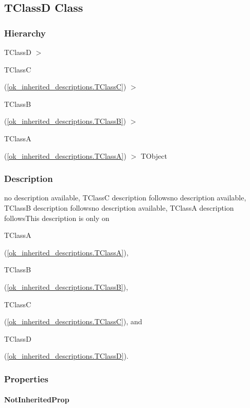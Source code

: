 \documentclass{report}
\begin{document}
\subsection*{TClassD Class}
\subsubsection*{\large{\textbf{Hierarchy}}\normalsize\hspace{1ex}\hfill}
TClassD {$>$} \begin{ttfamily}TClassC\end{ttfamily}(\ref{ok_inherited_descriptions.TClassC}) {$>$} \begin{ttfamily}TClassB\end{ttfamily}(\ref{ok_inherited_descriptions.TClassB}) {$>$} \begin{ttfamily}TClassA\end{ttfamily}(\ref{ok_inherited_descriptions.TClassA}) {$>$} 
TObject
\subsubsection*{\large{\textbf{Description}}\normalsize\hspace{1ex}\hfill}
no description available, TClassC description followsno description available, TClassB description followsno description available, TClassA description followsThis description is only on \begin{ttfamily}TClassA\end{ttfamily}(\ref{ok_inherited_descriptions.TClassA}), \begin{ttfamily}TClassB\end{ttfamily}(\ref{ok_inherited_descriptions.TClassB}), \begin{ttfamily}TClassC\end{ttfamily}(\ref{ok_inherited_descriptions.TClassC}), and \begin{ttfamily}TClassD\end{ttfamily}(\ref{ok_inherited_descriptions.TClassD}).\subsubsection*{\large{\textbf{Properties}}\normalsize\hspace{1ex}\hfill}
\paragraph*{NotInheritedProp}\hspace*{\fill}
\end{document}
